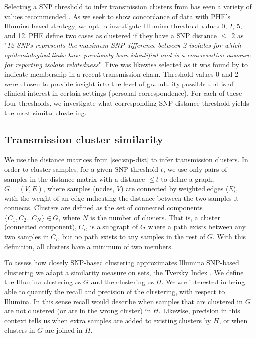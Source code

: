Selecting a SNP threshold to infer transmission clusters from has seen a variety of values recommended \cite{stimson2019}. As we seek to show concordance of \ont{} data with PHE's Illumina-based strategy, we opt to investigate Illumina threshold values 0, 2, 5, and 12. PHE define two cases as clustered if they have a SNP distance $\le 12$ as "\emph{12 SNPs represents the maximum SNP difference between 2 isolates for which epidemiological links have previously been identified \cite{walker2013} and is a conservative measure for reporting isolate relatedness}"\cite{phe-tb-england}. Five was likewise selected as it was found by \cite{walker2013} to indicate membership in a recent transmission chain. Threshold values 0 and 2 were chosen to provide insight into the level of granularity possible and is of clinical interest in certain settings (personal correspondence). For each of these four thresholds, we investigate what corresponding \ont{} SNP distance threshold yields the most similar clustering.

\subsection{Transmission cluster similarity}
\label{sec:cluster-similarity}

We use the distance matrices from \autoref{sec:snp-dist} to infer transmission clusters. In order to cluster samples, for a given SNP threshold $t$, we use only pairs of samples in the distance matrix with a distance $\le t$ to define a graph, $G=(V,E)$, where samples (nodes, $V$) are connected by weighted edges ($E$), with the weight of an edge indicating the distance between the two samples it connects. Clusters are defined as the set of connected components $\{C_1, C_2...C_N\}\in G$, where $N$ is the number of clusters. That is, a cluster (connected component), $C_i$, is a subgraph of $G$ where a path exists between any two samples in $C_i$, but no path exists to any samples in the rest of $G$. With this definition, all clusters have a minimum of two members. 

To assess how closely \ont{} SNP-based clustering approximates Illumina SNP-based clustering we adapt a similarity measure on sets, the Tversky Index \cite{tversky1977}. We define the Illumina clustering as $G$ and the \ont{} clustering as $H$. We are interested in being able to quantify the recall and precision of the \ont{} clustering, with respect to Illumina. In this sense recall would describe when samples that are clustered in $G$ are not clustered (or are in the wrong cluster) in $H$. Likewise, precision in this context tells us when extra samples are added to existing clusters by $H$, or when clusters in $G$ are joined in $H$. 

